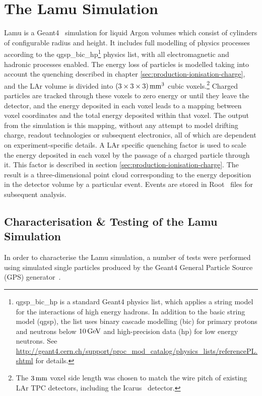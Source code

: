 \section{The Lamu Simulation}\label{sec:lamu}
Lamu is a Geant4~\citep{Geant4} simulation for liquid Argon volumes which consist of cylinders of configurable radius and height. It includes full modelling of physics processes according to the {\sc qgsp\_bic\_hp}\footnote{{\sc qgsp\_bic\_hp} is a standard Geant4 physics list, which applies a string model for the interactions of high energy hadrons. In addition to the basic string model ({\sc qgsp}), the list uses binary cascade modelling ({\sc bic}) for primary protons and neutrons below $10\,\mathrm{GeV}$ and high-precision data ({\sc hp}) for low energy neutrons. See \url{http://geant4.cern.ch/support/proc_mod_catalog/physics_lists/referencePL.shtml} for details.} physics list, with all electromagnetic and hadronic processes enabled. The energy loss of particles is modelled taking into account the quenching described in chapter \ref{sec:production-ionisation-charge}, and the \ac{LAr} volume is divided into $(3\times 3\times 3) \,\mathrm{mm}^3$ cubic voxels.\footnote{The $3\,\mathrm{mm}$ voxel side length was chosen to match the wire pitch of existing \acs{LAr TPC} detectors, including the {\sc Icarus}~\citep{Amerio2004} detector.} Charged particles are tracked through these voxels to zero energy or until they leave the detector, and the energy deposited in each voxel leads to a mapping between voxel coordinates and the total energy deposited within that voxel. The output from the simulation is this mapping, without any attempt to model drifting charge, readout technologies or subsequent electronics, all of which are dependent on experiment-specific details. A \ac{LAr} specific quenching factor is used to scale the energy deposited in each voxel by the passage of a charged particle through it. This factor is described in section \ref{sec:production-ionisation-charge}. The result is a three-dimensional point cloud corresponding to the energy deposition in the detector volume by a particular event. Events are stored in {\sc Root}~\citep{Root} files for subsequent analysis.

\subsection{Characterisation \& Testing of the Lamu Simulation}
In order to characterise the Lamu simulation, a number of tests were performed using simulated single particles produced by the Geant4 General Particle Source (GPS) generator~\citep{GeantGPS}.

